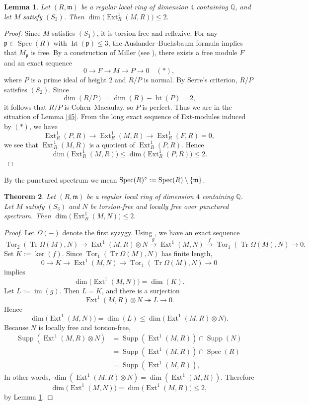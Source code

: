 \documentclass[11.05pt,a4paper]{amsart}
\newtheorem{theorem}{Theorem}[section]
\newtheorem{lemma}[theorem]{Lemma}
\theoremstyle{definition}
\theoremstyle{remark}
\newcommand{\Spec}{\operatorname{Spec}}
\newcommand{\Tr}{\operatorname{Tr}}
\newcommand{\Ext}{\operatorname{Ext}}
\newcommand{\Supp}{\operatorname{Supp}}
\newcommand{\Tor}{\operatorname{Tor}}
\newcommand{\lo}{\longrightarrow}
\newcommand{\fm}{\frak{m}}
\begin{document}
\begin{lemma}\label{47}
	Let $(R,\mathfrak{m})$ be a regular local ring of dimension $4$ containing $\mathbb{Q}$, and let $M$ satisfy $(S_3)$. Then
	\(
	\dim\!\big(\Ext^{1}_R(M,R)\big) \le 2.
	\)
\end{lemma}

\begin{proof}
	Since $M$ satisfies $(S_3)$, it is torsion-free and reflexive. For any $\mathfrak{p} \in \Spec(R)$ with $\operatorname{ht}(\mathfrak{p}) \le 3$, the Auslander–Buchsbaum formula implies that $M_{\mathfrak{p}}$ is free.
	By a construction of Miller (see \cite[Theorem 2.17]{syz}), there exists a free module $F$ and an exact sequence
	\[
	0 \lo F \lo M \lo P \lo 0 \quad(\ast),
	\]
	where $P$ is a prime ideal of height $2$ and $R/P$ is normal. By Serre’s criterion, $R/P$ satisfies $(S_2)$. Since
	\[
	\dim(R/P) = \dim(R) - \operatorname{ht}(P) = 2,
	\]
	it follows that $R/P$ is Cohen–Macaulay, so $P$ is perfect. Thus we are in the situation of Lemma \ref{45}.
From the long exact sequence of Ext-modules induced by $(\ast)$, we have
	\[
	\Ext^{1}_R(P,R) \lo \Ext^{1}_R(M,R) \lo \Ext^{1}_R(F,R) = 0,
	\]
	we see that $\Ext^{1}_R(M,R)$ is a quotient of $\Ext^{1}_R(P,R)$. Hence
	\[
	\dim\!\big(\Ext^{1}_R(M,R)\big) \le \dim\!\big(\Ext^{1}_R(P,R)\big) \le 2.
	\]
\end{proof}
By the punctured spectrum we mean $\Spec(R)^\circ:=\Spec(R)\setminus\{\fm\}$. 
\begin{theorem}\label{47thm}
	Let $(R,\mathfrak{m})$ be a regular local ring of dimension $4$ containing $\mathbb{Q}$. Let $M$ satisfy $(S_3)$ and $N$ be torsion-free and locally free over punctured spectrum. Then
	\(
	\dim\!\big(\Ext^{1}_R(M,N)\big) \le 2.
	\)
\end{theorem}

\begin{proof}
	Let $\Omega(-)$ denote the first syzygy. Using \cite{AB}, we have an exact sequence
	\[
	\Tor_2(\Tr \Omega(M),N) \to \Ext^{1}(M,R)\otimes N \xrightarrow{g}
	\Ext^{1}(M,N) \xrightarrow{f}
	\Tor_1(\Tr \Omega(M),N) \to 0.
	\]
	Set $K := \ker(f)$. Since $\Tor_1(\Tr \Omega(M),N)$ has finite length,
	\[
	0 \lo K \lo \Ext^{1}(M,N) \lo \Tor_1(\Tr \Omega(M),N) \lo 0
	\]
	implies
	\[
	\dim\!\big(\Ext^{1}(M,N)\big) = \dim(K).
	\]
	Let $L := \operatorname{im}(g)$. Then $L = K$, and there is a surjection
	\[
	\Ext^{1}(M,R)\otimes N \twoheadrightarrow L\to 0.
	\]
	Hence
	\[
	\dim\!\big(\Ext^{1}(M,N)\big) = \dim(L) \le \dim\!\big(\Ext^{1}(M,R)\otimes N\big).
	\]
	Because $N$ is locally free and torsion-free,  \begin{align*}\Supp(\Ext^{1}(M,R) \otimes N) &=\Supp(\Ext^{1}(M,R) )\cap \Supp( N) \\ &=\Supp(\Ext^{1}(M,R) )\cap \Spec(R)\\ &=\Supp(\Ext^{1}(M,R) ), \end{align*} In other words,
	\(
	\dim(\Ext^{1}(M,R)\otimes N) = \dim(\Ext^{1}(M,R)).
	\)
	Therefore
	\[
	\dim\!\big(\Ext^{1}(M,N)\big) = \dim\!\big(\Ext^{1}(M,R)\big) \le 2,
	\]
	by Lemma \ref{47}.
\end{proof}
\end{document}
